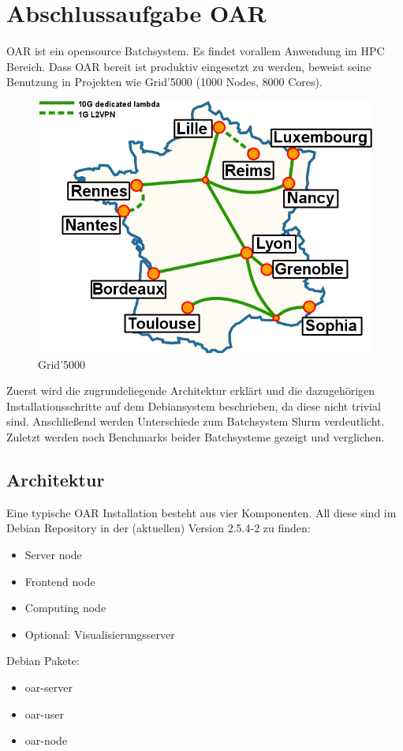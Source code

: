 \chapter{Abschlussaufgabe OAR}
OAR ist ein opensource Batchsystem. Es findet vorallem Anwendung im HPC Bereich.
Dass OAR bereit ist produktiv eingesetzt zu werden, beweist seine Benutzung in Projekten wie Grid'5000 (1000 Nodes, 8000 Cores).
\begin{figure}[H]
	\centering
	\includegraphics[scale=1.5]{grid5000.jpg} 
	\vspace{-10pt}
	\caption{Grid'5000}
\end{figure}
Zuerst wird die zugrundeliegende Architektur erklärt und die dazugehörigen Installationsschritte auf dem Debiansystem beschrieben,
da diese nicht trivial sind.
Anschließend werden Unterschiede zum Batchsystem Slurm verdeutlicht.
Zuletzt werden noch Benchmarks beider Batchsysteme gezeigt und verglichen.\pagebreak
\section{Architektur}
Eine typische OAR Installation besteht aus vier Komponenten. All diese sind im Debian Repository in der (aktuellen) Version 2.5.4-2 
zu finden:
    \begin{itemize}
        \item{Server node}
        \item{Frontend node}
        \item{Computing node}
        \item{Optional: Visualisierungsserver}
    \end{itemize}
    Debian Pakete:
    \begin{itemize}
        \item{oar-server}
        \item{oar-user}
        \item{oar-node}
    \end{itemize}

